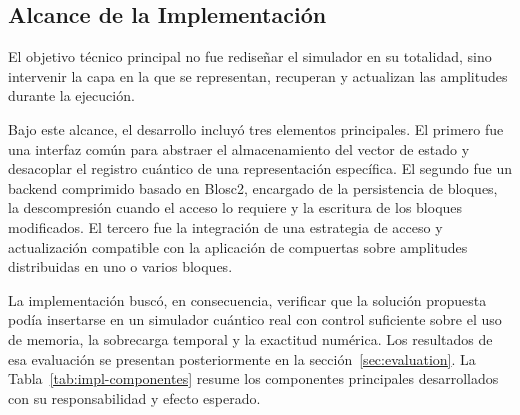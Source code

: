 \subsection{Alcance de la Implementación}

El objetivo técnico principal no fue rediseñar el simulador en su totalidad, sino intervenir
la capa en la que se representan, recuperan y actualizan las amplitudes durante la
ejecución.

Bajo este alcance, el desarrollo incluyó tres elementos principales. El primero fue una
interfaz común para abstraer el almacenamiento del vector de estado y desacoplar el
registro cuántico de una representación específica. El segundo fue un backend
comprimido basado en Blosc2, encargado de la persistencia de bloques, la
descompresión cuando el acceso lo requiere y la escritura de los bloques modificados. El
tercero fue la integración de una estrategia de acceso y actualización compatible con la
aplicación de compuertas sobre amplitudes distribuidas en uno o varios bloques.

La implementación buscó, en consecuencia, verificar que la solución propuesta podía
insertarse en un simulador cuántico real con control suficiente sobre el uso de memoria,
la sobrecarga temporal y la exactitud numérica. Los resultados de esa evaluación se
presentan posteriormente en la sección~\ref{sec:evaluation}. La Tabla~\ref{tab:impl-componentes} resume los componentes principales desarrollados con su responsabilidad y efecto esperado.

